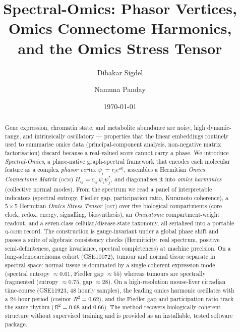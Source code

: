 \documentclass[preprint,12pt,amsmath,amssymb,superscriptaddress,floatfix]{revtex4-2}
\theoremstyle{definition}
\theoremstyle{plain}
\newcommand{\OCM}{\textsc{ocm}}
\newcommand{\OST}{\textsc{ost}}
\newcommand{\QOEHR}{\textsc{q-oehr}}
\begin{document}
\title{Spectral-Omics: Phasor Vertices, Omics Connectome Harmonics,\\
       and the Omics Stress Tensor}

\author{Dibakar Sigdel}
\author{Namuna Panday}

\date{\today}

\begin{abstract}
Gene expression, chromatin state, and metabolite abundance are noisy, high
dynamic-range, and intrinsically oscillatory --- properties that the linear
embeddings routinely used to summarise omics data (principal-component
analysis, non-negative matrix factorisation) discard because a real-valued
score cannot carry a phase. We introduce \emph{Spectral-Omics}, a phase-native
graph-spectral framework that encodes each molecular feature as a complex
\emph{phasor vertex} $\psi_i = r_i e^{i\theta_i}$, assembles a Hermitian
\emph{Omics Connectome Matrix} (\OCM) $H_{ij} = c_{ij}\,\psi_i\psi_j^{*}$, and
diagonalises it into \emph{omics harmonics} (collective normal modes). From the
spectrum we read a panel of interpretable indicators (spectral entropy, Fiedler
gap, participation ratio, Kuramoto coherence), a $5\times5$ Hermitian
\emph{Omics Stress Tensor} (\OST) over five biological compartments (core clock,
redox, energy, signalling, biosynthesis), an \emph{Omicatome} compartment-weight
readout, and a seven-class cellular/disease-state taxonomy, all serialised into
a portable \QOEHR{} record. The construction is gauge-invariant under a global
phase shift and passes a suite of algebraic consistency checks (Hermiticity,
real spectrum, positive semi-definiteness, gauge invariance, spectral
completeness) at machine precision. On a lung-adenocarcinoma cohort (GSE10072),
tumour and normal tissue separate in spectral space: normal tissue is dominated
by a single coherent expression mode (spectral entropy $\approx0.61$, Fiedler
gap $\approx55$) whereas tumours are spectrally fragmented (entropy
$\approx0.75$, gap $\approx28$). On a high-resolution mouse-liver circadian
time-course (GSE11923, 48 hourly samples), the leading omics harmonic oscillates
with a $24$-hour period (cosinor $R^2 = 0.62$), and the Fiedler gap and
participation ratio track the same rhythm ($R^2 = 0.68$ and $0.66$). The method
recovers biologically coherent structure without supervised training and is
provided as an installable, tested software package.
\end{abstract}
\end{document}
